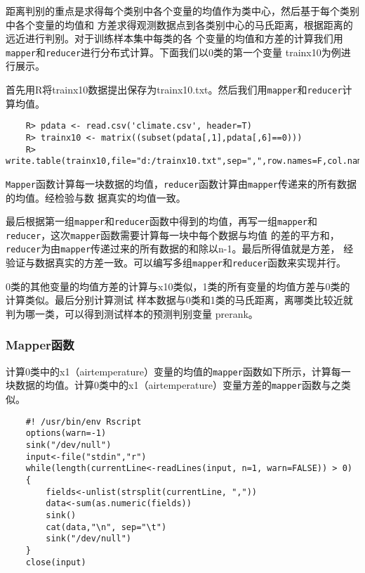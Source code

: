距离判别的重点是求得每个类别中各个变量的均值作为类中心，然后基于每个类别中各个变量的均值和
方差求得观测数据点到各类别中心的马氏距离，根据距离的远近进行判别。对于训练样本集中每类的各
个变量的均值和方差的计算我们用\lstinline!mapper!和\lstinline!reducer!进行分布式计算。下面我们以0类的第一个变量
trainx10为例进行展示。

首先用R将trainx10数据提出保存为trainx10.txt。然后我们用\lstinline!mapper!和\lstinline!reducer!计算均值。

\begin{lstlisting}
	R> pdata <- read.csv('climate.csv', header=T)
	R> trainx10 <- matrix((subset(pdata[,1],pdata[,6]==0)))
	R> write.table(trainx10,file="d:/trainx10.txt",sep=",",row.names=F,col.names=F)
\end{lstlisting}

\lstinline|Mapper|函数计算每一块数据的均值，\lstinline!reducer!函数计算由\lstinline!mapper!传递来的所有数据的均值。经检验与数
据真实的均值一致。

最后根据第一组\lstinline|mapper|和\lstinline|reducer|函数中得到的均值，再写一组\lstinline!mapper!和\lstinline!reducer!，这次\lstinline!mapper!函数需要计算每一块中每个数据与均值
的差的平方和，\lstinline!reducer!为由\lstinline!mapper!传递过来的所有数据的和除以n-1。最后所得值就是方差，
经验证与数据真实的方差一致。可以编写多组\lstinline|mapper|和\lstinline|reducer|函数来实现并行。

0类的其他变量的均值方差的计算与x10类似，1类的所有变量的均值方差与0类的计算类似。最后分别计算测试
样本数据与0类和1类的马氏距离，离哪类比较近就判为哪一类，可以得到测试样本的预测判别变量
prerank。

\subsubsection{Mapper函数}\label{mapperux51fdux6570}

计算0类中的x1（airtemperature）变量的均值的\lstinline!mapper!函数如下所示，计算每一块数据的均值。计算0类中的x1（airtemperature）变量方差的\lstinline!mapper!函数与之类似。

\begin{lstlisting}
	#! /usr/bin/env Rscript
	options(warn=-1)
	sink("/dev/null")
	input<-file("stdin","r")
	while(length(currentLine<-readLines(input, n=1, warn=FALSE)) > 0)   
	{
	    fields<-unlist(strsplit(currentLine, ","))
	    data<-sum(as.numeric(fields))
	    sink()
	    cat(data,"\n", sep="\t")
	    sink("/dev/null")
	}
	close(input)
\end{lstlisting}

